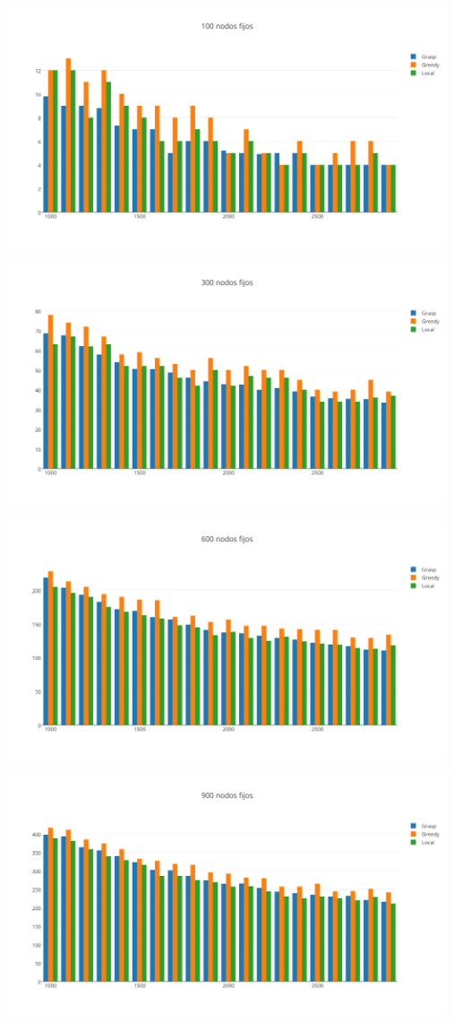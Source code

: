 \begin{center}
 	\includegraphics[width=13cm, keepaspectratio=yes]{imagenes/6/100NodosFijos.png}

 	\includegraphics[width=13cm, keepaspectratio=yes]{imagenes/6/300NodosFijos.png}
 
 	\includegraphics[width=13cm, keepaspectratio=yes]{imagenes/6/600NodosFijos.png}
 
 	\includegraphics[width=13cm, keepaspectratio=yes]{imagenes/6/900NodosFijos.png}
\end{center}
 
